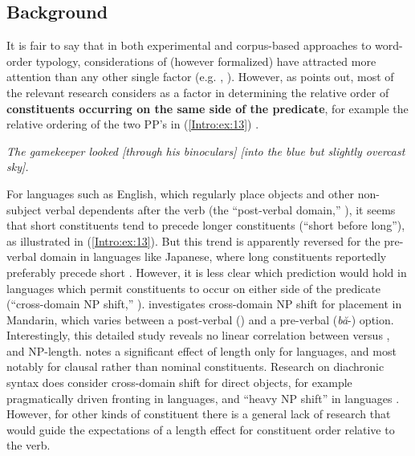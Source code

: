 \documentclass[output=paper,colorlinks,citecolor=brown,collectionchapter]{langscibook}
\begin{document}
\subsection{Background}\label{Intro:ss:5.1}

\begin{sloppypar}
It is fair to say that in both experimental and corpus-based approaches to word-order typology, considerations of  (however formalized) have attracted more attention than any other single factor (e.g. \citealt{FaghiriSamvelian2020SOV,SchnellSchiborr2022Cross}, \citealt[5--10]{wasow_factors_2022}). However, as \citet{yao_np_2018} points out, most of the relevant research considers  as a factor in determining the relative order of \textbf{constituents occurring on the same side of the predicate}, for example the relative ordering of the two PP's in (\ref{Intro:ex:13}) \citep[from][6]{wasow_factors_2022}.
\end{sloppypar}

\ea\label{Intro:ex:13} 
\textit{The gamekeeper looked [through his binoculars] [into the blue but slightly overcast sky].}
\z


\begin{sloppypar}
For languages such as English, which regularly place objects and other non-subject verbal dependents after the verb (the ``post-verbal domain,'' \citealt{yao_np_2018}), it seems that short constituents tend to precede longer constituents (``short before long''), as illustrated in (\ref{Intro:ex:13}). But this trend is apparently reversed for the pre-verbal domain in  languages like Japanese, where long constituents reportedly preferably precede short \citep{YamashitaChang2001headfinal}. However, it is less clear which prediction would hold in languages which permit constituents to occur on either side of the predicate (``cross-domain NP shift,'' \citealt{yao_np_2018}). \citet{yao_np_2018} investigates cross-domain NP shift for  placement in Mandarin, which varies between a post-verbal () and a pre-verbal (\textit{bă}-) option. Interestingly, this detailed study reveals no linear correlation between  versus , and NP-length. \citet[560]{levshina_token-based_2019} notes a significant effect of length only for  languages, and most notably for clausal rather than nominal constituents. Research on diachronic syntax does consider cross-domain shift for direct objects, for example pragmatically driven  fronting in  languages, and ``heavy NP shift'' in  languages \citep[205]{faarlund_word_2010}. However, for other kinds of constituent there is a general lack of research that would guide the expectations of a length effect for constituent order relative to the verb.
\end{sloppypar}
\end{document}
